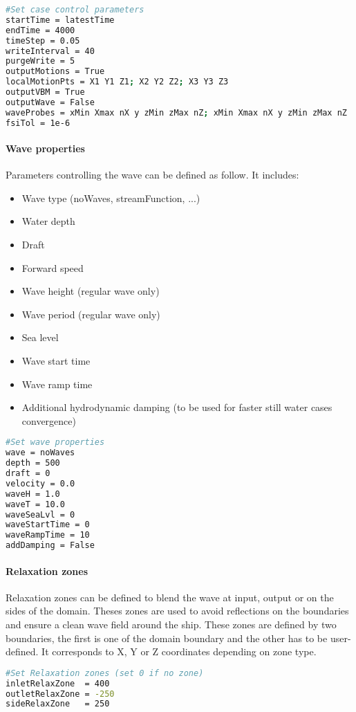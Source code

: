 \begin{lstlisting}[language=bash]
#Set case control parameters
startTime = latestTime
endTime = 4000
timeStep = 0.05
writeInterval = 40
purgeWrite = 5
outputMotions = True
localMotionPts = X1 Y1 Z1; X2 Y2 Z2; X3 Y3 Z3
outputVBM = True
outputWave = False
waveProbes = xMin Xmax nX y zMin zMax nZ; xMin Xmax nX y zMin zMax nZ
fsiTol = 1e-6
\end{lstlisting}

\paragraph{Wave properties}
Parameters controlling the wave can be defined as follow. It includes:
\begin{itemize}
\item Wave type (noWaves, streamFunction, ...)
\item Water depth
\item Draft
\item Forward speed
\item Wave height (regular wave only)
\item Wave period (regular wave only)
\item Sea level
\item Wave start time 
\item Wave ramp time
\item Additional hydrodynamic damping (to be used for faster still water cases convergence)
\end{itemize}

\begin{lstlisting}[language=bash]
#Set wave properties
wave = noWaves
depth = 500
draft = 0
velocity = 0.0
waveH = 1.0
waveT = 10.0
waveSeaLvl = 0
waveStartTime = 0
waveRampTime = 10
addDamping = False
\end{lstlisting}

\paragraph{Relaxation zones}
Relaxation zones can be defined to blend the wave at input, output or on the sides of the domain. Theses zones are used to avoid reflections on the boundaries and ensure a clean wave field around the ship. These zones are defined by two boundaries, the first is one of the domain boundary and the other has to be user-defined. It corresponds to X, Y or Z coordinates depending on zone type.
\begin{lstlisting}[language=bash]
#Set Relaxation zones (set 0 if no zone)
inletRelaxZone  = 400
outletRelaxZone = -250
sideRelaxZone   = 250
\end{lstlisting}

